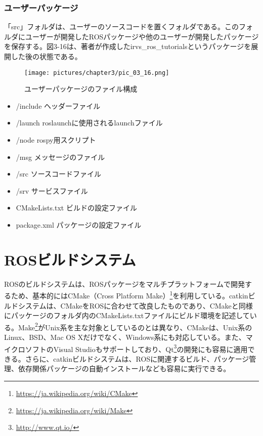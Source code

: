 \subsubsection{ユーザーパッケージ}

「src」フォルダは、ユーザーのソースコードを置くフォルダである。このフォルダにユーザーが開発したROSパッケージや他のユーザーが開発したパッケージを保存する。図3-16は、著者が作成したirvs\_ros\_tutorialsというパッケージを展開した後の状態である。

\begin{figure}[h]
  \centering
  \texttt{[image: pictures/chapter3/pic\_03\_16.png]}
  \caption{ユーザーパッケージのファイル構成}
\end{figure}

\vspace{\baselineskip}
\begin{itemize}
\item /include    ヘッダーファイル
\item /launch   roslaunchに使用されるlaunchファイル
\item /node     rospy用スクリプト
\item /msg      メッセージのファイル
\item /src      ソースコードファイル
\item /srv      サービスファイル
\item CMakeLists.txt  ビルドの設定ファイル
\item package.xml   パッケージの設定ファイル
\end{itemize}
\vspace{\baselineskip}

\section{ROSビルドシステム}

ROSのビルドシステムは、ROSパッケージをマルチプラットフォームで開発するため、基本的にはCMake（Cross Platform Make）\footnote{\url{https://ja.wikipedia.org/wiki/CMake}}を利用している。catkinビルドシステムは、CMakeをROSに合わせて改良したものであり、CMakeと同様にパッケージのフォルダ内のCMakeLists.txtファイルにビルド環境を記述している。Make\footnote{\url{https://ja.wikipedia.org/wiki/Make}}がUnix系を主な対象としているのとは異なり、CMakeは、Unix系のLinux、BSD、Mac OS Xだけでなく、Windows系にも対応している。また、マイクロソフトのVisual Studioもサポートしており、Qt\footnote{\url{http://www.qt.io/}}の開発にも容易に適用できる。さらに、catkinビルドシステムは、ROSに関連するビルド、パッケージ管理、依存関係パッケージの自動インストールなども容易に実行できる。

